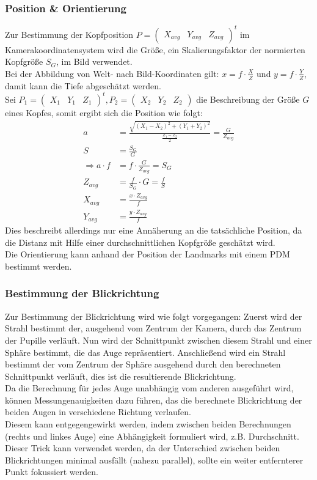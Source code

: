 \subsubsection{Position \& Orientierung}
\label{OpenFace_Pos_Ori}
Zur Bestimmung der Kopfposition $P= \begin{pmatrix}
X_{avg} & Y_{avg} & Z_{avg}
\end{pmatrix}^t$ im Kamerakoordinatensystem wird die Größe, ein Skalierungsfaktor der normierten Kopfgröße $S_G$, im Bild verwendet.\\
Bei der Abbildung von Welt- nach Bild-Koordinaten gilt: $x=f\cdot \frac{X}{Z}$ und $ y=f\cdot \frac{Y}{Z}$, damit kann die Tiefe abgeschätzt werden.\\
Sei $P_1 = \begin{pmatrix}
X_1&Y_1&Z_1
\end{pmatrix}^t, P_2= \begin{pmatrix}
X_2&Y_2&Z_2
\end{pmatrix}$ die Beschreibung der Größe $G$ eines Kopfes, somit ergibt sich die Position wie folgt:\\
\begin{align*}
a &= \frac{\sqrt{(X_1-X_2)^2+(Y_1+Y_2)^2}}{\frac{Z_1-Z_2}{2}} =\frac{G}{Z_{avg}}\\
S &= \frac{S_G}{G}\\
\Rightarrow a\cdot f &= f\cdot\frac{G}{Z_{avg}} = S_G\\
Z_{avg} &= \frac{f}{S_G}\cdot G = \frac{f}{S}\\
X_{avg} &= \frac{x \cdot Z_{avg}}{f}\\
Y_{avg} &= \frac{y \cdot Z_{avg}}{f}
\end{align*}
Dies beschreibt allerdings nur eine Annäherung an die tatsächliche Position, da die Distanz mit Hilfe einer durchschnittlichen Kopfgröße geschätzt wird.\\
Die Orientierung kann anhand der Position der Landmarks mit einem PDM bestimmt werden. \cite{OpenFace}
\subsubsection{Bestimmung der Blickrichtung}
\label{OpenFace_Blickrichtung}
Zur Bestimmung der Blickrichtung wird wie folgt vorgegangen: Zuerst wird der Strahl bestimmt der, ausgehend vom Zentrum der Kamera, durch das Zentrum der Pupille verläuft. Nun wird der Schnittpunkt zwischen diesem Strahl und einer Sphäre bestimmt, die das Auge repräsentiert. Anschließend wird ein Strahl bestimmt der vom Zentrum der Sphäre ausgehend durch den berechneten Schnittpunkt verläuft, dies ist die resultierende Blickrichtung.\cite{OpenFace}\\
Da die Berechnung für jedes Auge unabhängig vom anderen ausgeführt wird, können Messungenauigkeiten dazu führen, das die berechnete Blickrichtung der beiden Augen in verschiedene Richtung verlaufen.\\
Diesem kann entgegengewirkt werden, indem zwischen beiden Berechnungen (rechts und linkes Auge) eine Abhängigkeit formuliert wird, z.B. Durchschnitt.\\
Dieser Trick kann verwendet werden, da der Unterschied zwischen beiden Blickrichtungen minimal ausfällt (nahezu parallel), sollte ein weiter entfernterer Punkt fokussiert werden.
